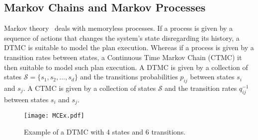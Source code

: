 \subsection{Markov Chains and Markov Processes}
Markov theory~\cite{norris1998markov} deals with memoryless processes. If a process is given by a sequence of actions that changes the system's state disregarding its history, a DTMC is suitable to model the plan execution. Whereas if a process is given by a transition rates between states, a Continuous Time Markov Chain (CTMC) it then suitable to model such plan execution.
A DTMC is given by a collection of states  $\mathcal{S}=\{s_1,s_2,\ldots,s_d\}$
and the transitions probabilities $p_{ij}$ between states $s_i$ and $s_j$. A CTMC is given by a collection of states $\mathcal{S}$ and the transition rates $q_{ij}^{-1}$ between states $s_i$ and $s_j$.


\begin{figure}[h]
\centering
\texttt{[image: MCEx.pdf]}
\caption{Example of a DTMC with 4 states and 6 transitions.}
\label{stoch:bg.fig.mc}
\end{figure}



